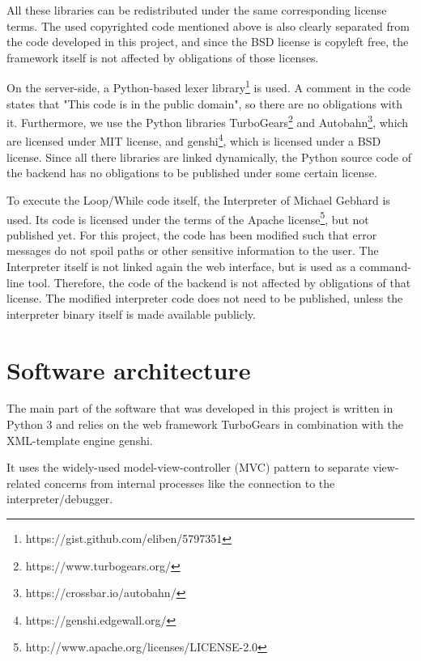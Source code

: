 
All these libraries can be redistributed under the same corresponding license terms.
The used copyrighted code mentioned above is also clearly separated from the code developed
in this project, and since the BSD license is copyleft free, the framework itself is not affected by obligations of those licenses.

On the server-side, a Python-based lexer library\footnote{https://gist.github.com/eliben/5797351} is used. A comment in the code
states that "This code is in the public domain", so there are no obligations with it.
Furthermore, we use the Python libraries TurboGears\footnote{https://www.turbogears.org/} and Autobahn\footnote{https://crossbar.io/autobahn/},
which are licensed under MIT license, and genshi\footnote{https://genshi.edgewall.org/}, which is licensed
under a BSD license. Since all there libraries are linked dynamically, the Python source code of the backend has no obligations to be
published under some certain license.

To execute the Loop/While code itself, the Interpreter of Michael Gebhard is used\cite{Gebhard2018}. Its code is licensed under the terms
of the Apache license\footnote{http://www.apache.org/licenses/LICENSE-2.0}, but not published yet. For this project, the code has been modified such that
error messages do not spoil paths or other sensitive information to the user. The Interpreter itself is not linked again the web interface,
but is used as a command-line tool.
Therefore, the code of the backend is not affected by obligations of that license. The modified interpreter code does not need to be published,
unless the interpreter binary itself is made available publicly.

\section{Software architecture}
The main part of the software that was developed in this project is written in Python 3 and relies on the web 
framework TurboGears in combination with the XML-template engine genshi.

It uses the widely-used model-view-controller (MVC) pattern \cite{Starke2011} to separate view-related concerns from
internal processes like the connection to the interpreter/debugger.


